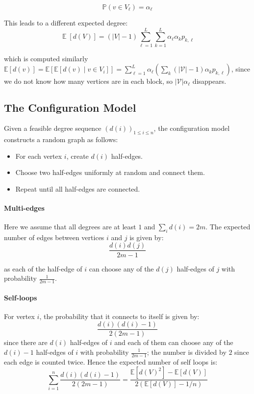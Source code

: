 \documentclass{article}
\begin{document}
\begin{equation*}
    \mathbb{P}(v\in V_{\ell}) = \alpha_{\ell}
\end{equation*}  

This leads to a different expected degree:
 \begin{equation*}
    \operatorname{\mathbb{E}}[d(V)]=(|V|-1)\sum_{\ell=1}^{L}\sum_{k=1}^{L}\alpha_{\ell}\alpha_{k}p_{k,\ell}
 \end{equation*}

 which is computed similarly $\mathbb{E}[d(v)]=\mathbb{E}[\mathbb{E}[d(v) \mid v \in V_i]]=\sum_{\ell=1}^{L}\alpha_{\ell}\left(\sum_{k}(|\mathcal{V}|-1)\alpha_{k} p_{k, \ell}\right)$, since we do not know how many vertices are in each block, so $|\mathcal{V}|\alpha_{\ell}$ disappears.



\subsection{The Configuration Model}  
Given a feasible degree sequence $(d(i))_{1\leq i \leq n}$, the configuration model constructs a random graph as follows: 
\begin{itemize}
    \item For each vertex $i$, create $d(i)$ half-edges.
    \item Choose two half-edges uniformly at random and connect them.
    \item Repeat until all half-edges are connected.
\end{itemize}

\paragraph{Multi-edges} Here we assume that all degrees are at least $1$ and $\sum_i d(i) = 2m$. The expected number of edges between vertices $i$ and $j$ is given by:
\begin{equation*}
    \frac{d(i)d(j)}{2m-1}
\end{equation*}

as each of the half-edge of $i$ can choose any of the $d(j)$ half-edges of $j$ with probability $\frac{1}{2m-1}$.  

\paragraph{Self-loops} For vertex $i$, the probability that it connects to itself is given by:
\begin{equation*}
    \frac{d(i) (d(i)-1)}{2(2m-1)}
\end{equation*}
since there are $d(i)$ half-edges of $i$ and each of them can choose any of the $d(i)-1$ half-edges of $i$ with probability $\frac{1}{2m-1}$; the number is divided by $2$ since each edge is counted twice.  Hence the expected number of self loops is:
\begin{equation*}
    \sum_{i=1}^{n}\frac{d(i)(d(i)-1)}{2(2m-1)}=\frac{\mathbb{E}[d(V)^{2}]-\mathbb{E}[d(V)]}{2(\mathbb{E}[d(V)]-1/n)}
\end{equation*}
\end{document}
